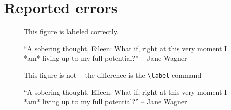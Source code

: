 \documentclass[a4paper]{article}
\begin{document}
\fi


\clearpage
\section{Reported errors}


\begin{figure}[!ht]
This figure is labeled correctly.
\caption{``A sobering thought, Eileen: What if, right at this very moment I
*am* living up to my full potential?'' -- Jane Wagner\label{xxx}}
\end{figure}

\begin{figure}[!ht]
This figure is not -- the difference is the \verb+\label+ command
\caption{\label{yyy}``A sobering thought, Eileen: What if, right at this very
moment I *am* living up to my full potential?'' -- Jane Wagner}
\end{figure}
\end{document}

